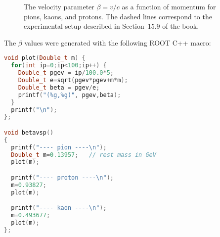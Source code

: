 \documentclass[a4paper,10pt]{article}
\begin{document}
\begin{figure}[htb]
\begin{center}
\caption{The velocity parameter $\beta=v/c$ as a function of momentum for pions,
kaons, and protons. The dashed lines correspond to the experimental setup described
in Section~15.9 of the book.}
\end{center}
\end{figure}

\vskip 5cm
\doclicenseThis
\newpage


The $\beta$ values were generated with the following ROOT C++ macro:
\begin{lstlisting}[language=C++]
void plot(Double_t m) {
  for(int ip=0;ip<100;ip++) {
    Double_t pgev = ip/100.0*5;
    Double_t e=sqrt(pgev*pgev+m*m);
    Double_t beta = pgev/e;
    printf("(%g,%g)", pgev,beta);
  }
  printf("\n");
};

void betavsp()
{
  printf("---- pion ----\n");
  Double_t m=0.13957;   // rest mass in GeV
  plot(m);

  printf("---- proton ----\n");
  m=0.93827;
  plot(m);

  printf("---- kaon ----\n");
  m=0.493677;
  plot(m);
};
\end{lstlisting}
\end{document}
